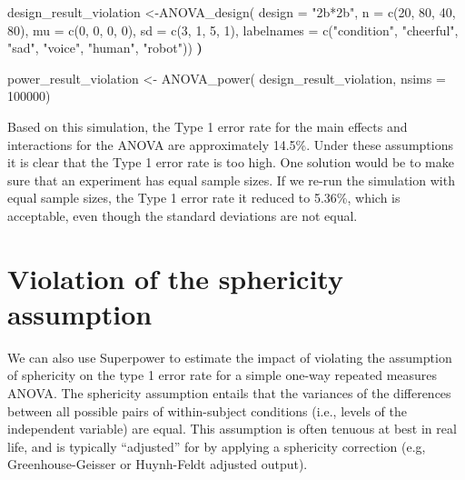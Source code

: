 \documentclass[
]{book}
\newenvironment{Shaded}{\begin{snugshade}}{\end{snugshade}}
\newcommand{\AttributeTok}[1]{\textcolor[rgb]{0.77,0.63,0.00}{#1}}
\newcommand{\DecValTok}[1]{\textcolor[rgb]{0.00,0.00,0.81}{#1}}
\newcommand{\ErrorTok}[1]{\textcolor[rgb]{0.64,0.00,0.00}{\textbf{#1}}}
\newcommand{\FunctionTok}[1]{\textcolor[rgb]{0.00,0.00,0.00}{#1}}
\newcommand{\NormalTok}[1]{#1}
\newcommand{\OtherTok}[1]{\textcolor[rgb]{0.56,0.35,0.01}{#1}}
\newcommand{\StringTok}[1]{\textcolor[rgb]{0.31,0.60,0.02}{#1}}
\begin{document}
\begin{Shaded}
\begin{Highlighting}[]
\NormalTok{design\_result\_violation }\OtherTok{\textless{}{-}}\FunctionTok{ANOVA\_design}\NormalTok{(}
  \AttributeTok{design =} \StringTok{"2b*2b"}\NormalTok{,}
  \AttributeTok{n =} \FunctionTok{c}\NormalTok{(}\DecValTok{20}\NormalTok{, }\DecValTok{80}\NormalTok{, }\DecValTok{40}\NormalTok{, }\DecValTok{80}\NormalTok{),}
  \AttributeTok{mu =} \FunctionTok{c}\NormalTok{(}\DecValTok{0}\NormalTok{, }\DecValTok{0}\NormalTok{, }\DecValTok{0}\NormalTok{, }\DecValTok{0}\NormalTok{),}
  \AttributeTok{sd =} \FunctionTok{c}\NormalTok{(}\DecValTok{3}\NormalTok{, }\DecValTok{1}\NormalTok{, }\DecValTok{5}\NormalTok{, }\DecValTok{1}\NormalTok{),}
  \AttributeTok{labelnames =} \FunctionTok{c}\NormalTok{(}\StringTok{"condition"}\NormalTok{, }\StringTok{"cheerful"}\NormalTok{, }\StringTok{"sad"}\NormalTok{, }\StringTok{"voice"}\NormalTok{, }\StringTok{"human"}\NormalTok{, }\StringTok{"robot"}\NormalTok{))}
\ErrorTok{)}

\NormalTok{power\_result\_violation }\OtherTok{\textless{}{-}} \FunctionTok{ANOVA\_power}\NormalTok{(}
\NormalTok{  design\_result\_violation,}
  \AttributeTok{nsims =} \DecValTok{100000}\NormalTok{)}
\end{Highlighting}
\end{Shaded}

Based on this simulation, the Type 1 error rate for the main effects and interactions for the ANOVA are approximately 14.5\%.
Under these assumptions it is clear that the Type 1 error rate is too high.
One solution would be to make sure that an experiment has equal sample sizes.
If we re-run the simulation with equal sample sizes, the Type 1 error rate it reduced to 5.36\%, which is acceptable, even though the standard deviations are not equal.

\hypertarget{violation-of-the-sphericity-assumption}{%
\section{Violation of the sphericity assumption}\label{violation-of-the-sphericity-assumption}}

We can also use Superpower to estimate the impact of violating the assumption of sphericity on the type 1 error rate for a simple one-way repeated measures ANOVA.
The sphericity assumption entails that the variances of the differences between all possible pairs of within-subject conditions (i.e., levels of the independent variable) are equal.
This assumption is often tenuous at best in real life, and is typically ``adjusted'' for by applying a sphericity correction (e.g, Greenhouse-Geisser or Huynh-Feldt adjusted output).
\end{document}
